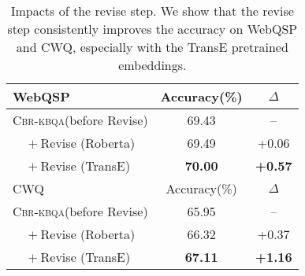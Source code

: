 \documentclass[11pt]{article}
\newcommand{\alg}{\textsc{Cbr-kbqa}\xspace}
\begin{document}
\begin{table}[t]
    \centering
    \small
    \begin{tabular}{@{}l c c@{}}
    \toprule
        WebQSP &  Accuracy(\%) & $\Delta$\\
        \midrule
        \alg (before Revise) & 69.43 & --\\
        $\quad+$Revise (Roberta) & 69.49 & +0.06\\
        $\quad+$Revise (TransE) & \textbf{70.00} & \textbf{+0.57}\\
        \midrule
        CWQ &  Accuracy(\%) & $\Delta$\\
        \midrule
        \alg (before Revise) & 65.95 & --\\
        $\quad+$Revise (Roberta) & 66.32 & +0.37 \\
        $\quad+$Revise (TransE) & \textbf{67.11} & \textbf{+1.16}\\
    \bottomrule
    \end{tabular}
    \caption{Impacts of the revise step. We show that the revise step consistently improves the accuracy on WebQSP and CWQ, especially with the TransE pretrained embeddings.}
    \label{tab:revise}
    \vspace{-6mm}
\end{table}
\end{document}
